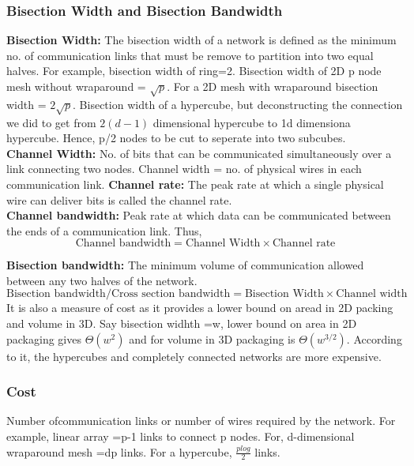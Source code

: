 \documentclass[12pt]{article}
\begin{document}
\subsubsection{Bisection Width and Bisection Bandwidth}
\textbf{Bisection Width: }The bisection width of a network is defined as the minimum no. of communication links that must be remove to partition into
two equal halves. For example, bisection width of ring=2. Bisection width of 2D p node mesh without wraparound = $\sqrt{p}$. For a 2D mesh with wraparound bisection 
width = $2\sqrt{p}$. Bisection width of a hypercube, but deconstructing the connection we did to get from $2(d-1)$ dimensional hypercube to 1d dimensiona hypercube. Hence, 
p/2 nodes to be cut to seperate into two subcubes.\\
\textbf{Channel Width: } No. of bits that can be communicated simultaneously over a link connecting two nodes. Channel width = no. of physical wires in each communication link.
\textbf{Channel rate: }The peak rate at which a single physical wire can deliver bits is called the channel rate.\\
\textbf{Channel bandwidth: }Peak rate at which data can be communicated between the ends of a communication link.
Thus, 
\begin{equation}
    \text{Channel bandwidth} = \text{Channel Width} \times \text{Channel rate}
\end{equation}

\textbf{Bisection bandwidth: }The minimum volume of communication allowed between any two halves of the network.
\begin{equation}
    \text{Bisection bandwidth/Cross section bandwidth} = \text{Bisection Width} \times \text{Channel width}
\end{equation}
It is also a measure of cost as it provides a lower bound on aread in 2D packing and volume in 3D.
Say bisection widhth =w, lower bound on area in 2D packaging gives $\Theta(w^2)$ and for volume in 3D packaging is $\Theta(w^{3/2})$.
According to it, the hypercubes and completely connected networks are more expensive.

\subsubsection{Cost}
Number ofcommunication links or number of wires required by the network.
For example, linear array =p-1 links to connect p nodes. For, d-dimensional wraparound mesh =dp links.
For a hypercube, $\frac{plog}{2}$ links. 
\end{document}
